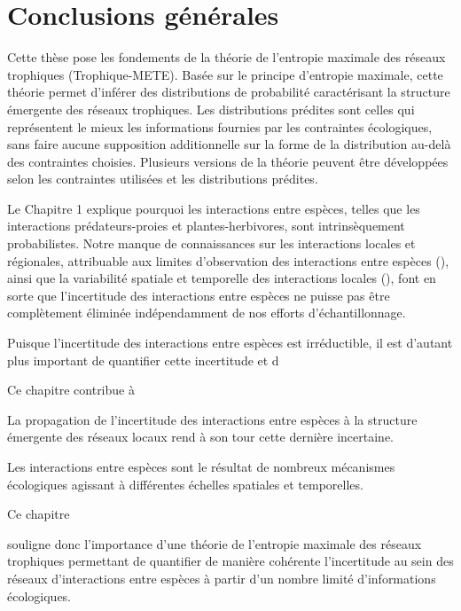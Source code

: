 
\francais   
\chapter*{Conclusions générales}


Cette thèse pose les fondements de la théorie de l'entropie maximale des réseaux
trophiques (Trophique-METE). Basée sur le principe d'entropie maximale, cette
théorie permet d'inférer des distributions de probabilité caractérisant la
structure émergente des réseaux trophiques. Les distributions prédites sont
celles qui représentent le mieux les informations fournies par les contraintes
écologiques, sans faire aucune supposition additionnelle sur la forme de la
distribution au-delà des contraintes choisies. Plusieurs versions de la théorie
peuvent être développées selon les contraintes utilisées et les distributions
prédites. 

Le Chapitre 1 explique pourquoi les interactions entre espèces, telles que les
interactions prédateurs-proies et plantes-herbivores, sont intrinsèquement
probabilistes. Notre manque de connaissances sur les interactions locales et
régionales, attribuable aux limites d'observation des interactions entre espèces
(\cite{Jordano2016Sampling}), ainsi que la variabilité spatiale et temporelle
des interactions locales (\cite{Poisot2015Species}), font en sorte que
l'incertitude des interactions entre espèces ne puisse pas être complètement
éliminée indépendamment de nos efforts d'échantillonnage. 


Puisque l'incertitude
des interactions entre espèces est irréductible, il est d'autant plus important 
de quantifier cette incertitude et d

Ce chapitre contribue 
à 

La propagation de
l'incertitude des interactions entre espèces à la structure émergente des
réseaux locaux rend à son tour cette dernière incertaine. 


Les interactions entre espèces sont le résultat de nombreux
mécanismes écologiques agissant à différentes échelles spatiales et temporelles.

Ce chapitre 

souligne donc l'importance d'une théorie de l'entropie maximale des
réseaux trophiques permettant de quantifier de manière cohérente l'incertitude
au sein des réseaux d'interactions entre espèces à partir d'un nombre limité
d'informations écologiques.





